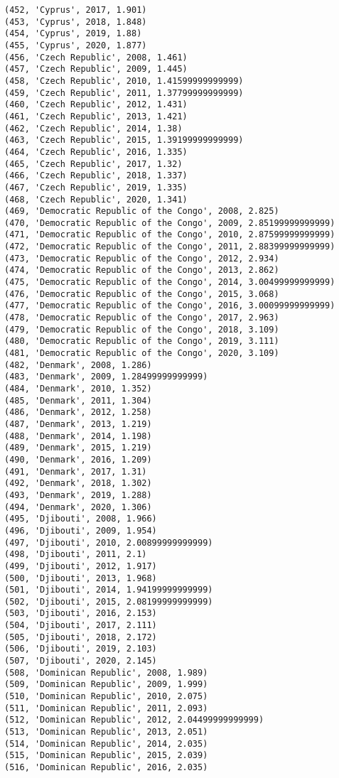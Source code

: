 \documentclass[11pt]{article}
\begin{document}
\begin{Verbatim}[commandchars=\\\{\}]
(452, 'Cyprus', 2017, 1.901)
(453, 'Cyprus', 2018, 1.848)
(454, 'Cyprus', 2019, 1.88)
(455, 'Cyprus', 2020, 1.877)
(456, 'Czech Republic', 2008, 1.461)
(457, 'Czech Republic', 2009, 1.445)
(458, 'Czech Republic', 2010, 1.41599999999999)
(459, 'Czech Republic', 2011, 1.37799999999999)
(460, 'Czech Republic', 2012, 1.431)
(461, 'Czech Republic', 2013, 1.421)
(462, 'Czech Republic', 2014, 1.38)
(463, 'Czech Republic', 2015, 1.39199999999999)
(464, 'Czech Republic', 2016, 1.335)
(465, 'Czech Republic', 2017, 1.32)
(466, 'Czech Republic', 2018, 1.337)
(467, 'Czech Republic', 2019, 1.335)
(468, 'Czech Republic', 2020, 1.341)
(469, 'Democratic Republic of the Congo', 2008, 2.825)
(470, 'Democratic Republic of the Congo', 2009, 2.85199999999999)
(471, 'Democratic Republic of the Congo', 2010, 2.87599999999999)
(472, 'Democratic Republic of the Congo', 2011, 2.88399999999999)
(473, 'Democratic Republic of the Congo', 2012, 2.934)
(474, 'Democratic Republic of the Congo', 2013, 2.862)
(475, 'Democratic Republic of the Congo', 2014, 3.00499999999999)
(476, 'Democratic Republic of the Congo', 2015, 3.068)
(477, 'Democratic Republic of the Congo', 2016, 3.00099999999999)
(478, 'Democratic Republic of the Congo', 2017, 2.963)
(479, 'Democratic Republic of the Congo', 2018, 3.109)
(480, 'Democratic Republic of the Congo', 2019, 3.111)
(481, 'Democratic Republic of the Congo', 2020, 3.109)
(482, 'Denmark', 2008, 1.286)
(483, 'Denmark', 2009, 1.28499999999999)
(484, 'Denmark', 2010, 1.352)
(485, 'Denmark', 2011, 1.304)
(486, 'Denmark', 2012, 1.258)
(487, 'Denmark', 2013, 1.219)
(488, 'Denmark', 2014, 1.198)
(489, 'Denmark', 2015, 1.219)
(490, 'Denmark', 2016, 1.209)
(491, 'Denmark', 2017, 1.31)
(492, 'Denmark', 2018, 1.302)
(493, 'Denmark', 2019, 1.288)
(494, 'Denmark', 2020, 1.306)
(495, 'Djibouti', 2008, 1.966)
(496, 'Djibouti', 2009, 1.954)
(497, 'Djibouti', 2010, 2.00899999999999)
(498, 'Djibouti', 2011, 2.1)
(499, 'Djibouti', 2012, 1.917)
(500, 'Djibouti', 2013, 1.968)
(501, 'Djibouti', 2014, 1.94199999999999)
(502, 'Djibouti', 2015, 2.08199999999999)
(503, 'Djibouti', 2016, 2.153)
(504, 'Djibouti', 2017, 2.111)
(505, 'Djibouti', 2018, 2.172)
(506, 'Djibouti', 2019, 2.103)
(507, 'Djibouti', 2020, 2.145)
(508, 'Dominican Republic', 2008, 1.989)
(509, 'Dominican Republic', 2009, 1.999)
(510, 'Dominican Republic', 2010, 2.075)
(511, 'Dominican Republic', 2011, 2.093)
(512, 'Dominican Republic', 2012, 2.04499999999999)
(513, 'Dominican Republic', 2013, 2.051)
(514, 'Dominican Republic', 2014, 2.035)
(515, 'Dominican Republic', 2015, 2.039)
(516, 'Dominican Republic', 2016, 2.035)

\end{Verbatim}
\end{document}
